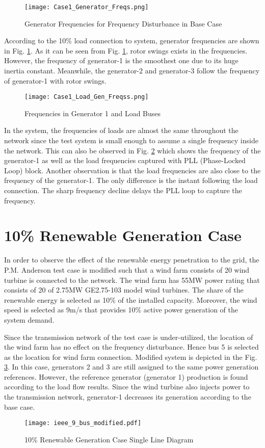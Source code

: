 \begin{figure}[h]
	\centering
	\texttt{[image: Case1\_Generator\_Freqs.png]}
	\caption{Generator Frequencies for Frequency Disturbance in Base Case}
	\label{genfreqcase1}
\end{figure}
According to the 10\% load connection to system, generator frequencies are shown in Fig. \ref{genfreqcase1}. As it can be seen from Fig. \ref{genfreqcase1}, rotor swings exists in the frequencies. However, the frequency of generator-1 is the smoothest one due to its huge inertia constant. Meanwhile, the generator-2 and generator-3 follow the frequency of generator-1 with rotor swings.\par
\begin{figure}[h!]
	\centering
	\texttt{[image: Case1\_Load\_Gen\_Freqss.png]}
	\caption{Frequencies in Generator 1 and Load Buses}
	\label{genfreqcase1_loadgen}
\end{figure}
In the system, the frequencies of loads are almost the same throughout the network since the test system is small enough to assume a single frequency inside the network. This can also be observed in Fig. \ref{genfreqcase1_loadgen} which shows the frequency of the generator-1 as well as the load frequencies captured with PLL (Phase-Locked Loop) block. Another observation is that the load frequencies are also close to the frequency of the generator-1. The only difference is the instant following the load connection. The sharp frequency decline delays the PLL loop to capture the frequency.
\section{10\% Renewable Generation Case}
\label{sec:kmodified}
In order to observe the effect of the renewable energy penetration to the grid, the P.M. Anderson test case is modified such that a wind farm consists of 20 wind turbine is connected to the network. The wind farm has 55MW power rating that consists of 20 of 2.75MW GE2.75-103 model wind turbines. The share of the renewable energy is selected as 10\% of the installed capacity. Moreover, the wind speed is selected as 9m/s that provides 10\% active power generation of the system demand. \par 
Since the transmission network of the test case is under-utilized, the location of the wind farm has no effect on the frequency disturbance. Hence bus 5 is selected as the location for wind farm connection. Modified system is depicted in the Fig. \ref{ieee_9_bus_case2}. In this case, generators 2 and 3 are still assigned to the same power generation references. However, the reference generator (generator 1) production is found according to the load flow results. Since the wind turbine also injects power to the transmission network, generator-1 decreases its generation according to the base case.
\begin{figure}[h!]
	\centering
	\texttt{[image: ieee\_9\_bus\_modified.pdf]}
	\caption{10\% Renewable Generation Case Single Line Diagram}
	\label{ieee_9_bus_case2}
\end{figure}
